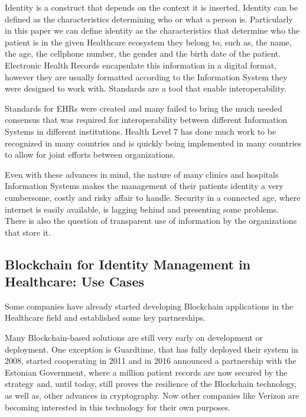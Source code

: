 \documentclass[]{llncs}
\begin{document}
Identity is a construct that depends on the context it is inserted.
Identity can be defined as the characteristics determining who or what a person is.
Particularly in this paper we can define identity as the characteristics that 
determine who the patient is in the given Healthcare ecosystem they belong to, such as, the name, 
the age, the cellphone number, the gender and the birth date of the patient.
Electronic Health Records encapsulate this information in a digital format,  
however they are usually formatted according to the Information System they 
were designed to work with. Standards are a tool that enable interoperability.

Standards for EHRs were created and many failed to bring the much needed 
consensus that was required for interoperability between different 
Information Systems in different institutions. 
Health Level 7 has done much work to be recognized in many countries and 
is quickly being implemented in many countries to allow for joint efforts 
between organizations.

Even with these advances in mind, the nature of many clinics and hospitals Information Systems 
makes the management of their patients identity a very cumbersome, costly and risky affair to handle. 
Security in a connected age, where internet is easily available, is lagging behind 
and presenting some problems. 
There is also the question of transparent use of information by the organizations 
that store it.
%

\subsection{Blockchain for Identity Management in Healthcare: Use Cases}
Some companies have already started developing Blockchain applications in the Healthcare field 
and established some key partnerships.

Many Blockchain-based solutions are still very early on development or deployment. 
One exception is Guardtime, that has fully deployed their system in 2008, started cooperating in 2011 
and in 2016 announced a partnership with the Estonian Government, where a million patient records 
are now secured by the strategy and, until today, still proves the resilience of the Blockchain 
technology, as well as, other advances in cryptography. 
Now other companies like Verizon are becoming interested in this technology for their own purposes.
\cite{GuardTime2018,EstonianGovernmentGuardTime2016}
\end{document}
